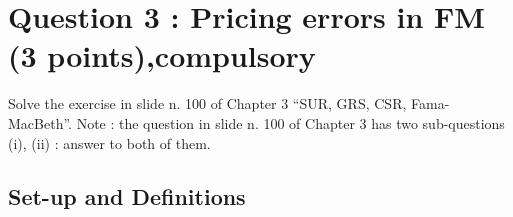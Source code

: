 \documentclass[]{article}
\title{}
\author{}
\begin{document}
\maketitle

\section*{Question 3 : Pricing errors in FM (3 points),compulsory}
Solve the exercise in slide n. 100 of Chapter 3 “SUR, GRS, CSR, Fama-MacBeth”. Note : the question in slide n. 100 of Chapter 3 has two sub-questions (i), (ii) : answer to both of them.\\

\subsection{Set-up and Definitions}
\end{document}

